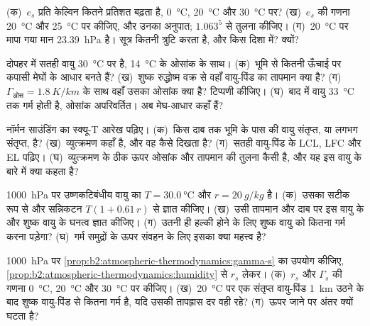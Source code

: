 \begin{exercise}[$\star$]\label{exo:b2:atmospheric-thermodynamics:2}
(क)~$e_s$ प्रति केल्विन कितने प्रतिशत बढ़ता है, \qty{0}{\celsius}, \qty{20}{\celsius} और
\qty{30}{\celsius} पर? (ख)~$e_s$ की गणना \qty{20}{\celsius} और \qty{25}{\celsius} पर कीजिए, और उनका
अनुपात; $1.063^5$ से तुलना कीजिए। (ग)~\qty{20}{\celsius} पर मापा गया मान
\qty{23.39}{hPa} है। सूत्र कितनी त्रुटि करता है, और किस दिशा में? क्यों?
\end{exercise}

\begin{exercise}[$\star$]\label{exo:b2:atmospheric-thermodynamics:3}
दोपहर में सतही वायु \qty{30}{\celsius} पर है, \qty{14}{\celsius} के ओसांक के साथ। (क)~भूमि से
कितनी ऊँचाई पर कपासी मेघों के आधार बनते हैं? (ख)~शुष्क रुद्धोष्म वक्र से वहाँ वायु-पिंड का तापमान
क्या है? (ग)~$\Gamma_{\text{ओस}} =
\qty{1.8}{K/km}$ के साथ वहाँ उसका ओसांक क्या है? टिप्पणी कीजिए। (घ)~बाद में वायु \qty{33}{\celsius} तक गर्म होती है, ओसांक
अपरिवर्तित। अब मेघ-आधार कहाँ हैं?
\end{exercise}

\begin{exercise}[$\star$]\label{exo:b2:atmospheric-thermodynamics:4}
नॉर्मन साउंडिंग का स्क्यू-T आरेख पढ़िए। (क)~किस दाब तक भूमि के पास की वायु
संतृप्त, या लगभग संतृप्त, है? (ख)~व्युत्क्रमण कहाँ है, और वह कैसे दिखता है? (ग)~सतही वायु-पिंड के
LCL, LFC और EL पढ़िए। (घ)~व्युत्क्रमण के ठीक ऊपर ओसांक और तापमान की
तुलना कैसी है, और यह इस वायु के बारे में क्या कहता है?
\end{exercise}

\begin{exercise}[$\star\star$]\label{exo:b2:atmospheric-thermodynamics:5}
\qty{1000}{hPa} पर उष्णकटिबंधीय वायु का $T = \qty{30.0}{\celsius}$ और $r = \qty{20}{g/kg}$ है। (क)~उसका
 सटीक रूप से और सन्निकटन $T(1 + 0.61\,r)$ से ज्ञात कीजिए। (ख)~उसी तापमान और दाब पर इस वायु
के और शुष्क वायु के घनत्व ज्ञात कीजिए। (ग)~उतनी ही हल्की होने के लिए शुष्क वायु को कितना
गर्म करना पड़ेगा? (घ)~गर्म समुद्रों के ऊपर संवहन के लिए इसका क्या महत्त्व है?
\end{exercise}

\begin{exercise}[$\star\star$]\label{exo:b2:atmospheric-thermodynamics:6}
\qty{1000}{hPa} पर \cref{prop:b2:atmospheric-thermodynamics:gamma-s} का उपयोग कीजिए,
\cref{prop:b2:atmospheric-thermodynamics:humidity} से $r_s$ लेकर। (क)~$r_s$ और $\Gamma_s$ की गणना
\qty{0}{\celsius}, \qty{20}{\celsius} और \qty{30}{\celsius} पर कीजिए। (ख)~\qty{20}{\celsius} पर एक संतृप्त वायु-पिंड
\qty{1}{km} उठने के बाद शुष्क वायु-पिंड से कितना गर्म है, यदि उसकी तापह्रास दर
वही रहे? (ग)~ऊपर जाने पर अंतर क्यों घटता है?
\end{exercise}

